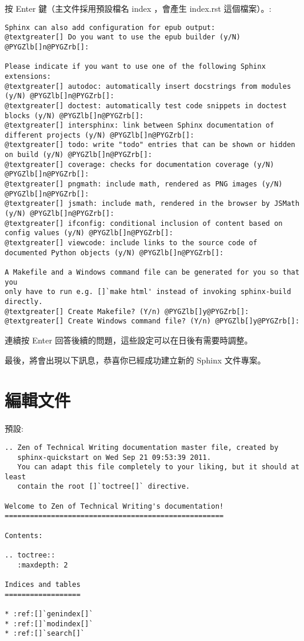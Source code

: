\documentclass[a4paper,12pt,english]{sphinxmanual}
\begin{document}
按 Enter 鍵（主文件採用預設檔名 index ，會產生 index.rst 這個檔案）。:

\begin{Verbatim}[commandchars=@\[\]]
Sphinx can also add configuration for epub output:
@textgreater[] Do you want to use the epub builder (y/N) @PYGZlb[]n@PYGZrb[]:

Please indicate if you want to use one of the following Sphinx extensions:
@textgreater[] autodoc: automatically insert docstrings from modules (y/N) @PYGZlb[]n@PYGZrb[]:
@textgreater[] doctest: automatically test code snippets in doctest blocks (y/N) @PYGZlb[]n@PYGZrb[]:
@textgreater[] intersphinx: link between Sphinx documentation of different projects (y/N) @PYGZlb[]n@PYGZrb[]:
@textgreater[] todo: write "todo" entries that can be shown or hidden on build (y/N) @PYGZlb[]n@PYGZrb[]:
@textgreater[] coverage: checks for documentation coverage (y/N) @PYGZlb[]n@PYGZrb[]:
@textgreater[] pngmath: include math, rendered as PNG images (y/N) @PYGZlb[]n@PYGZrb[]:
@textgreater[] jsmath: include math, rendered in the browser by JSMath (y/N) @PYGZlb[]n@PYGZrb[]:
@textgreater[] ifconfig: conditional inclusion of content based on config values (y/N) @PYGZlb[]n@PYGZrb[]:
@textgreater[] viewcode: include links to the source code of documented Python objects (y/N) @PYGZlb[]n@PYGZrb[]:

A Makefile and a Windows command file can be generated for you so that you
only have to run e.g. []`make html' instead of invoking sphinx-build
directly.
@textgreater[] Create Makefile? (Y/n) @PYGZlb[]y@PYGZrb[]:
@textgreater[] Create Windows command file? (Y/n) @PYGZlb[]y@PYGZrb[]:
\end{Verbatim}

連續按 Enter 回答後續的問題，這些設定可以在日後有需要時調整。

最後，將會出現以下訊息，恭喜你已經成功建立新的 Sphinx 文件專案。


\section{編輯文件}
\label{sphinx_firstlook::doc}\label{sphinx_firstlook:id1}
預設:

\begin{Verbatim}[commandchars=@\[\]]
.. Zen of Technical Writing documentation master file, created by
   sphinx-quickstart on Wed Sep 21 09:53:39 2011.
   You can adapt this file completely to your liking, but it should at least
   contain the root []`toctree[]` directive.

Welcome to Zen of Technical Writing's documentation!
====================================================

Contents:

.. toctree::
   :maxdepth: 2

Indices and tables
==================

* :ref:[]`genindex[]`
* :ref:[]`modindex[]`
* :ref:[]`search[]`
\end{Verbatim}
\end{document}
